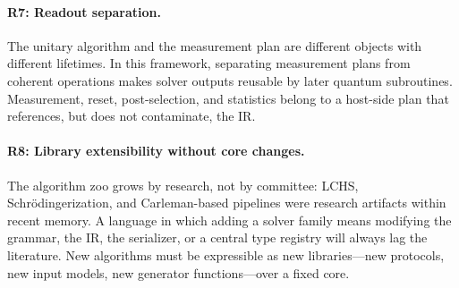 \paragraph{R7: Readout separation.}
The unitary algorithm and the measurement plan are different objects with
different lifetimes.  In this framework, separating measurement plans from coherent operations
makes solver outputs reusable by later quantum subroutines.  Measurement, reset, post-selection, and statistics belong
to a host-side plan that references, but does not contaminate, the IR.

\paragraph{R8: Library extensibility without core changes.}
The algorithm zoo grows by research, not by committee: LCHS, Schr\"odingerization,
and Carleman-based pipelines were research artifacts within recent memory.
A language in which adding a solver family means modifying the grammar, the
IR, the serializer, or a central type registry will always lag the
literature.  New algorithms must be expressible as new libraries---new
protocols, new input models, new generator functions---over a fixed core.

